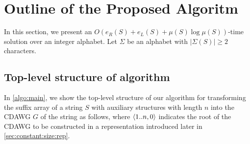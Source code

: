 \documentclass{article}
\begin{document}




\section{Outline of the Proposed Algoritm}

In this section, we present an $O(e_R(S) + e_L(S) + \mu(S)\log \mu(S))$-time solution over an integer alphabet.
Let $\Sigma$ be an alphabet with $|\Sigma(S)| \ge 2$ characters. 

\subsection{Top-level structure of algorithm}
In \cref{algo:main}, we show the top-level structure of our algorithm for transforming the suffix array of a string $S$ with auxiliary structures with length $n$ into the CDAWG $G$ of the string as follows, where $\langle 1..n, 0\rangle$ indicates the root of the CDAWG to be constructed in a representation introduced later in \cref{sec:constant:size:rep}. 
{
\setlength{\algotitleheightrule}{0pt}%
\begin{algorithm}[h]
  \caption{Transforming $SA$ and $S$ into its CDAWG $G$.
  }\label{algo:main}
\end{algorithm}
}
\end{document}
